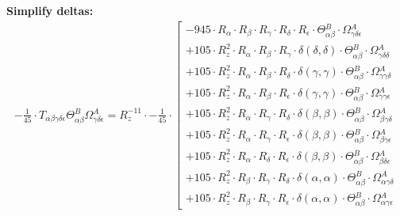 \documentclass{article}
\begin{document}
\textbf{Simplify deltas:}
\begin{subequations}\begin{gather}
- \frac{1}{45} \cdot T_{\alpha{}\beta{}\gamma{}\delta{}\epsilon{}} \Theta{}^{B}_{\alpha{}\beta{}} \Omega{}^{A}_{\gamma{}\delta{}\epsilon{}} = R_{z}^{-11} \cdot - \frac{1}{45} \cdot  \left[ \begin{array}{c} 
 		- 945 \cdot R_{\alpha{}} \cdot R_{\beta{}} \cdot R_{\gamma{}} \cdot R_{\delta{}} \cdot R_{\epsilon{}} \cdot \Theta{}^{B}_{\alpha{}\beta{}} \cdot \Omega{}^{A}_{\gamma{}\delta{}\epsilon{}} 
 \\[0.2em] 		 + 105 \cdot R_{z}^{2} \cdot R_{\alpha{}} \cdot R_{\beta{}} \cdot R_{\gamma{}} \cdot \delta{}\left(\delta{}, \delta{}\right) \cdot \Theta{}^{B}_{\alpha{}\beta{}} \cdot \Omega{}^{A}_{\gamma{}\delta{}\delta{}} 
 \\[0.2em] 		 + 105 \cdot R_{z}^{2} \cdot R_{\alpha{}} \cdot R_{\beta{}} \cdot R_{\delta{}} \cdot \delta{}\left(\gamma{}, \gamma{}\right) \cdot \Theta{}^{B}_{\alpha{}\beta{}} \cdot \Omega{}^{A}_{\gamma{}\gamma{}\delta{}} 
 \\[0.2em] 		 + 105 \cdot R_{z}^{2} \cdot R_{\alpha{}} \cdot R_{\beta{}} \cdot R_{\epsilon{}} \cdot \delta{}\left(\gamma{}, \gamma{}\right) \cdot \Theta{}^{B}_{\alpha{}\beta{}} \cdot \Omega{}^{A}_{\gamma{}\gamma{}\epsilon{}} 
 \\[0.2em] 		 + 105 \cdot R_{z}^{2} \cdot R_{\alpha{}} \cdot R_{\gamma{}} \cdot R_{\delta{}} \cdot \delta{}\left(\beta{}, \beta{}\right) \cdot \Theta{}^{B}_{\alpha{}\beta{}} \cdot \Omega{}^{A}_{\beta{}\gamma{}\delta{}} 
 \\[0.2em] 		 + 105 \cdot R_{z}^{2} \cdot R_{\alpha{}} \cdot R_{\gamma{}} \cdot R_{\epsilon{}} \cdot \delta{}\left(\beta{}, \beta{}\right) \cdot \Theta{}^{B}_{\alpha{}\beta{}} \cdot \Omega{}^{A}_{\beta{}\gamma{}\epsilon{}} 
 \\[0.2em] 		 + 105 \cdot R_{z}^{2} \cdot R_{\alpha{}} \cdot R_{\delta{}} \cdot R_{\epsilon{}} \cdot \delta{}\left(\beta{}, \beta{}\right) \cdot \Theta{}^{B}_{\alpha{}\beta{}} \cdot \Omega{}^{A}_{\beta{}\delta{}\epsilon{}} 
 \\[0.2em] 		 + 105 \cdot R_{z}^{2} \cdot R_{\beta{}} \cdot R_{\gamma{}} \cdot R_{\delta{}} \cdot \delta{}\left(\alpha{}, \alpha{}\right) \cdot \Theta{}^{B}_{\alpha{}\beta{}} \cdot \Omega{}^{A}_{\alpha{}\gamma{}\delta{}} 
 \\[0.2em] 		 + 105 \cdot R_{z}^{2} \cdot R_{\beta{}} \cdot R_{\gamma{}} \cdot R_{\epsilon{}} \cdot \delta{}\left(\alpha{}, \alpha{}\right) \cdot \Theta{}^{B}_{\alpha{}\beta{}} \cdot \Omega{}^{A}_{\alpha{}\gamma{}\epsilon{}} 

\end{array}
\end{gather}
\end{subequations}
\end{document}
